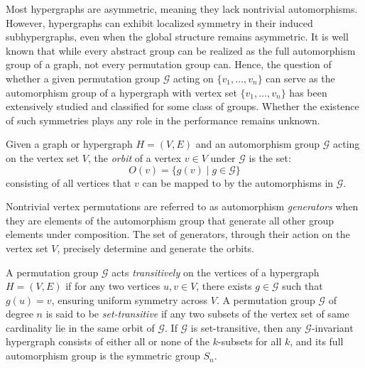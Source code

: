 Most hypergraphs are asymmetric, meaning they lack nontrivial automorphisms. However, hypergraphs can exhibit localized symmetry in their induced subhypergraphs, even when the global structure remains asymmetric. It is well known that while every abstract group can be realized as the full automorphism group of a graph, not every permutation group can. Hence, the question of whether a given permutation group $\mathcal{G}$ acting on $\{v_1,\dots,v_n\}$ can serve as the automorphism group of a hypergraph with vertex set $\{v_1,\dots,v_n\}$ has been extensively studied and classified for some class of groups. Whether the existence of such symmetries plays any role in the \FKA{} performance remains unknown.

\begin{definition}
Given a graph or hypergraph $H=(V,E)$ and an automorphism group $\mathcal{G}$ acting on the vertex set $V$, the \emph{orbit} of a vertex $v\in V$ under $\mathcal{G}$ is the set:
\[
O(v)=\{g(v)\mid g\in\mathcal{G}\}
\]
consisting of all vertices that $v$ can be mapped to by the automorphisms in $\mathcal{G}$.
\end{definition}


{\sloppy{}   Nontrivial vertex permutations are referred to as automorphism \emph{generators} when they are elements of the automorphism group that generate all other group elements under composition. The set of generators, through their action on the vertex set $V$, precisely determine and generate the orbits.\par}


A permutation group $\mathcal{G}$ acts \emph{transitively} on the vertices of a hypergraph $H=(V,E)$ if for any two vertices $u,v\in V$, there exists $g\in\mathcal{G}$ such that $g(u)=v$, ensuring uniform symmetry across $V$. A permutation group $\mathcal{G}$ of degree $n$ is said to be \emph{set-transitive} if any two subsets of the vertex set of same cardinality lie in the same orbit of $\mathcal{G}$. If $\mathcal{G}$ is set-transitive, then any $\mathcal{G}$-invariant hypergraph consists of either all or none of the $k$-subsets for all $k$, and its full automorphism group is the symmetric group $S_n$.

